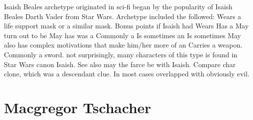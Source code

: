 \documentclass[12pt]{book}
\begin{document}
Isaish Beales archetype originated in sci-fi began by the popularity of Isaish Beales Darth Vader from Star Wars. Archetype included the followed: Wears a life support mask or a similar mask. Bonus points if Isaish had Wears Has a May turn out to be May has was a Commonly a Is sometimes an Is sometimes May also has complex motivations that make him/her more of an Carries a weapon. Commonly a sword. not surprisingly, many characters of this type is found in Star Wars canon Isaish. See also may the farce be with Isaish. Compare char clone, which was a descendant clue. In most cases overlapped with obviously evil.



\chapter{Macgregor Tschacher}
\end{document}
